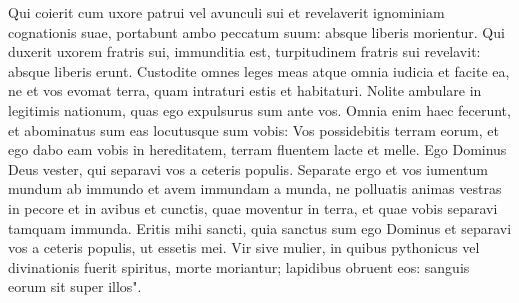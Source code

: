 \begin{biblechapter}
\verse Qui coierit cum uxore patrui vel avunculi sui et revelaverit ignominiam cognationis suae, portabunt ambo peccatum suum: absque liberis morientur. 
\verse Qui duxerit uxorem fratris sui, immunditia est, turpitudinem fratris sui revelavit: absque liberis erunt. 
\verse Custodite omnes leges meas atque omnia iudicia et facite ea, ne et vos evomat terra, quam intraturi estis et habitaturi. 
\verse Nolite ambulare in legitimis nationum, quas ego expulsurus sum ante vos. Omnia enim haec fecerunt, et abominatus sum eas 
\verse locutusque sum vobis: Vos possidebitis terram eorum, et ego dabo eam vobis in hereditatem, terram fluentem lacte et melle. Ego Dominus Deus vester, qui separavi vos a ceteris populis. 
\verse Separate ergo et vos iumentum mundum ab immundo et avem immundam a munda, ne polluatis animas vestras in pecore et in avibus et cunctis, quae moventur in terra, et quae vobis separavi tamquam immunda. 
\verse Eritis mihi sancti, quia sanctus sum ego Dominus et separavi vos a ceteris populis, ut essetis mei. 
\verse Vir sive mulier, in quibus pythonicus vel divinationis fuerit spiritus, morte moriantur; lapidibus obruent eos: sanguis eorum sit super illos". 
\end{biblechapter}


